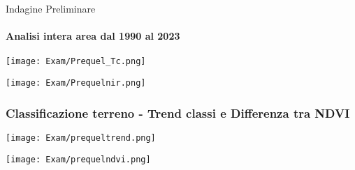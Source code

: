 \documentclass{beamer}  %
\begin{document}
\begin{frame}[fragile]{Indagine Preliminare}
 \framesubtitle{Analisi intera area dal 1990 al 2023}
 \begin{center} 
            \texttt{[image: Exam/Prequel\_Tc.png]}
       \end{center}
            \vspace{0.1cm}
             \begin{center} 
                \texttt{[image: Exam/Prequelnir.png]}
\end{center}
     \end{frame}
 
\begin{frame}[fragile]
    \frametitle{\scriptsize Classificazione terreno - Trend classi e Differenza tra NDVI}
 \begin{center} 
            \texttt{[image: Exam/prequeltrend.png]}
            \end{center}
             \begin{center} 

             \vspace{0.5cm}
                \texttt{[image: Exam/prequelndvi.png]}
\end{center}
     \end{frame}
\end{document}
